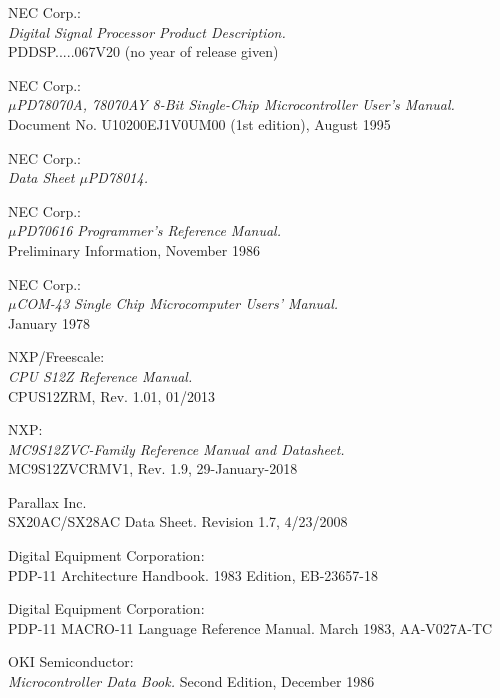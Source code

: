  NEC Corp.: \\
                {\em Digital Signal Processor Product Description.\/} \\
                PDDSP.....067V20 (no year of release given)

 NEC Corp.: \\
                {\em $\mu$PD78070A, 78070AY 8-Bit Single-Chip Microcontroller
                 User's Manual.\/} \\
                Document No. U10200EJ1V0UM00 (1st edition), August 1995

 NEC Corp.: \\
                  {\em Data Sheet $\mu$PD78014.\/}

 NEC Corp.: \\
                {\em $\mu$PD70616 Programmer's Reference Manual.\/} \\
                Preliminary Information, November 1986

 NEC Corp.: \\
                {\em $\mu$COM-43 Single Chip Microcomputer Users' Manual.\/} \\
                January 1978

 NXP/Freescale: \\
                {\em CPU S12Z Reference Manual.} \\
                CPUS12ZRM, Rev. 1.01, 01/2013

 NXP: \\
                {\em MC9S12ZVC-Family Reference Manual and Datasheet.} \\
                MC9S12ZVCRMV1, Rev. 1.9, 29-January-2018

 Parallax Inc. \\
                  { SX20AC/SX28AC Data Sheet.}
                  Revision 1.7, 4/23/2008

 Digital Equipment Corporation: \\
                  { PDP-11 Architecture Handbook.}
                  1983 Edition, EB-23657-18

 Digital Equipment Corporation: \\
                  { PDP-11 MACRO-11 Language Reference Manual.}
                  March 1983, AA-V027A-TC

 OKI Semiconductor: \\
                {\em Microcontroller Data Book.\/}
                Second Edition, December 1986


